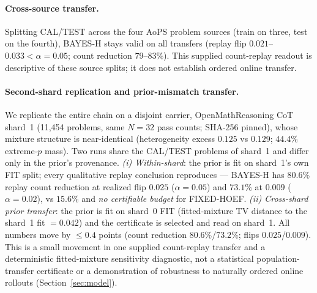 \documentclass{article}
\theoremstyle{definition}
\theoremstyle{remark}
\begin{document}
\paragraph{Cross-source transfer.} Splitting CAL/TEST across the four AoPS
problem sources (train on three, test on the fourth), BAYES-H stays valid on
all transfers (replay flip $0.021$--$0.033<\alpha=0.05$; count reduction $79$--$83\%$).
This supplied count-replay readout is descriptive of these source splits; it
does not establish ordered online transfer.

\paragraph{Second-shard replication and prior-mismatch transfer.}
We replicate the entire chain on a disjoint carrier, OpenMathReasoning CoT
shard~1 (11{,}454 problems, same $N{=}32$ pass counts; SHA-256 pinned), whose
mixture structure is near-identical (heterogeneity excess $0.125$ vs $0.129$;
$44.4\%$ extreme-$p$ mass). Two runs share the CAL/TEST problems of shard~1 and
differ only in the prior's provenance. \emph{(i) Within-shard}: the prior is
fit on shard~1's own FIT split; every qualitative replay conclusion reproduces ---
BAYES-H has $80.6\%$ replay count reduction at realized flip $0.025$ ($\alpha=0.05$) and $73.1\%$ at
$0.009$ ($\alpha=0.02$), vs $15.6\%$ and \emph{no certifiable budget} for
FIXED-HOEF. \emph{(ii) Cross-shard prior transfer}: the prior is fit on
shard~0 FIT (fitted-mixture TV distance to the shard~1 fit $=0.042$) and the
certificate is selected and read on shard~1. All numbers move by $\le0.4$
points (count reduction $80.6\%$/$73.2\%$; flips $0.025$/$0.009$). This is a
small movement in one supplied count-replay transfer and a deterministic
fitted-mixture sensitivity diagnostic, not a statistical population-transfer
certificate or a demonstration of robustness to naturally ordered online
rollouts (Section~\ref{sec:model}).
\end{document}
